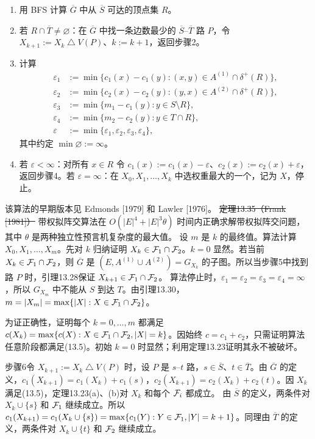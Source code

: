 \begin{enumerate}[label=\arabic*.,start=5]
\item 用 BFS 计算 $\overline G$ 中从 $\overline S$ 可达的顶点集 $R$。
\item 若 $R\cap\overline T\ne\varnothing$：在 $\overline G$ 中找一条边数最少的 $\overline S$--$\overline T$ 路 $P$，令 $X_{k+1}:=X_k\mathbin{\triangle}V(P)$、$k:=k+1$，返回步骤2。
\item 计算
\begin{align*}
\varepsilon_1&:=\min\{c_1(x)-c_1(y):(x,y)\in A^{(1)}\cap\delta^+(R)\},\\
\varepsilon_2&:=\min\{c_2(x)-c_2(y):(y,x)\in A^{(2)}\cap\delta^+(R)\},\\
\varepsilon_3&:=\min\{m_1-c_1(y):y\in S\setminus R\},\\
\varepsilon_4&:=\min\{m_2-c_2(y):y\in T\cap R\},\\
\varepsilon&:=\min\{\varepsilon_1,\varepsilon_2,\varepsilon_3,\varepsilon_4\},
\end{align*}
其中约定 $\min\varnothing:=\infty$。
\item 若 $\varepsilon<\infty$：对所有 $x\in R$ 令 $c_1(x):=c_1(x)-\varepsilon$、$c_2(x):=c_2(x)+\varepsilon$，返回步骤4。若 $\varepsilon=\infty$：在 $X_0,X_1,\ldots,X_k$ 中选权重最大的一个，记为 $X$，停止。
\end{enumerate}
该算法的早期版本见 Edmonds [1979] 和 Lawler [1976]。
\st{定理13.35（Frank [1981]）} 带权拟阵交算法在 $O(|E|^4+|E|^3\theta)$ 时间内正确求解带权拟阵交问题，其中 $\theta$ 是两种独立性预言机复杂度的最大值。
\pr 设 $m$ 是 $k$ 的最终值。算法计算 $X_0,X_1,\ldots,X_m$。先对 $k$ 归纳证明 $X_k\in\mathcal F_1\cap\mathcal F_2$。$k=0$ 显然。若当前 $X_k\in\mathcal F_1\cap\mathcal F_2$，则 $\overline G$ 是 $(E,A^{(1)}\cup A^{(2)})=G_{X_k}$ 的子图。所以当步骤5中找到路 $P$ 时，引理13.28保证 $X_{k+1}\in\mathcal F_1\cap\mathcal F_2$。
算法停止时，$\varepsilon_1=\varepsilon_2=\varepsilon_3=\varepsilon_4=\infty$，所以 $G_{X_m}$ 中不能从 $S$ 到达 $T$。由引理13.30，$m=|X_m|=\max\{|X|:X\in\mathcal F_1\cap\mathcal F_2\}$。

为证正确性，证明每个 $k=0,\ldots,m$ 都满足 $c(X_k)=\max\{c(X):X\in\mathcal F_1\cap\mathcal F_2,|X|=k\}$。因始终 $c=c_1+c_2$，只需证明算法任意阶段都满足(13.5)。初始 $k=0$ 时显然；利用定理13.23证明其永不被破坏。

步骤6令 $X_{k+1}:=X_k\mathbin{\triangle}V(P)$ 时，设 $P$ 是 $s$--$t$ 路，$s\in\overline S$、$t\in\overline T$。由 $\overline G$ 的定义，$c_1(X_{k+1})=c_1(X_k)+c_1(s)$，$c_2(X_{k+1})=c_2(X_k)+c_2(t)$。因 $X_k$ 满足(13.5)，定理13.23(a)、(b)对 $X_k$ 和每个 $\mathcal F_i$ 都成立。
由 $\overline S$ 的定义，两条件对 $X_k\cup\{s\}$ 和 $\mathcal F_1$ 继续成立。所以 $c_1(X_{k+1})=c_1(X_k\cup\{s\})=\max\{c_1(Y):Y\in\mathcal F_1,|Y|=k+1\}$。同理由 $\overline T$ 的定义，两条件对 $X_k\cup\{t\}$ 和 $\mathcal F_2$ 继续成立。

